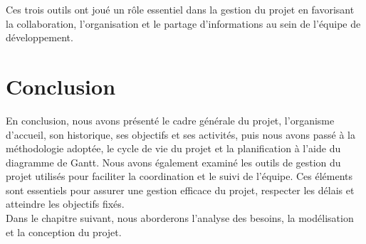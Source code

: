 Ces trois outils ont joué un rôle essentiel dans la gestion du projet en favorisant la collaboration, l'organisation et le partage d'informations au sein de l'équipe de développement.

\newpage

\section{Conclusion}
En conclusion, nous avons présenté le cadre générale du projet, l'organisme d'accueil, son historique, ses objectifs et ses activités, puis nous avons passé à la méthodologie adoptée, le cycle de vie du projet et la planification à l'aide du diagramme de Gantt. Nous avons également examiné les outils de gestion du projet utilisés pour faciliter la coordination et le suivi de l'équipe. Ces éléments sont essentiels pour assurer une gestion efficace du projet, respecter les délais et atteindre les objectifs fixés.\\
Dans le chapitre suivant, nous aborderons l'analyse des besoins, la modélisation et la conception du projet.